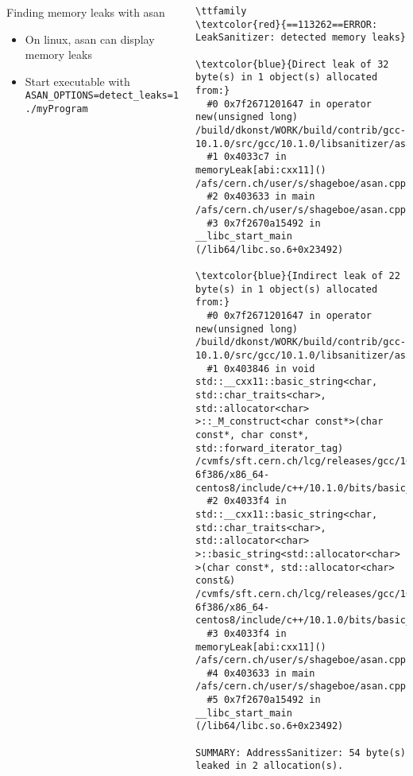 \begin{frame}[fragile]
  \begin{columns}
    \column{\textwidth+1cm}
    \begin{block}{Finding memory leaks with asan}
      \begin{itemize}
        \item On linux, asan can display memory leaks
        \item Start executable with \texttt{ASAN_OPTIONS=detect_leaks=1 ./myProgram}
      \end{itemize}
    \end{block}
    \scriptsize
    \begin{Verbatim}[commandchars=\\\{\}]
    \ttfamily
\textcolor{red}{==113262==ERROR: LeakSanitizer: detected memory leaks}

\textcolor{blue}{Direct leak of 32 byte(s) in 1 object(s) allocated from:}
  #0 0x7f2671201647 in operator new(unsigned long) /build/dkonst/WORK/build/contrib/gcc-10.1.0/src/gcc/10.1.0/libsanitizer/asan/asan_new_delete.cpp:99
  #1 0x4033c7 in memoryLeak[abi:cxx11]() /afs/cern.ch/user/s/shageboe/asan.cpp:33
  #2 0x403633 in main /afs/cern.ch/user/s/shageboe/asan.cpp:40
  #3 0x7f2670a15492 in __libc_start_main (/lib64/libc.so.6+0x23492)

\textcolor{blue}{Indirect leak of 22 byte(s) in 1 object(s) allocated from:}
  #0 0x7f2671201647 in operator new(unsigned long) /build/dkonst/WORK/build/contrib/gcc-10.1.0/src/gcc/10.1.0/libsanitizer/asan/asan_new_delete.cpp:99
  #1 0x403846 in void std::__cxx11::basic_string<char, std::char_traits<char>, std::allocator<char> >::_M_construct<char const*>(char const*, char const*, std::forward_iterator_tag) /cvmfs/sft.cern.ch/lcg/releases/gcc/10.1.0.c82-6f386/x86_64-centos8/include/c++/10.1.0/bits/basic_string.tcc:219
  #2 0x4033f4 in std::__cxx11::basic_string<char, std::char_traits<char>, std::allocator<char> >::basic_string<std::allocator<char> >(char const*, std::allocator<char> const&) /cvmfs/sft.cern.ch/lcg/releases/gcc/10.1.0.c82-6f386/x86_64-centos8/include/c++/10.1.0/bits/basic_string.h:247
  #3 0x4033f4 in memoryLeak[abi:cxx11]() /afs/cern.ch/user/s/shageboe/asan.cpp:33
  #4 0x403633 in main /afs/cern.ch/user/s/shageboe/asan.cpp:40
  #5 0x7f2670a15492 in __libc_start_main (/lib64/libc.so.6+0x23492)

SUMMARY: AddressSanitizer: 54 byte(s) leaked in 2 allocation(s).
    \end{Verbatim}
  \end{columns}
\end{frame}

